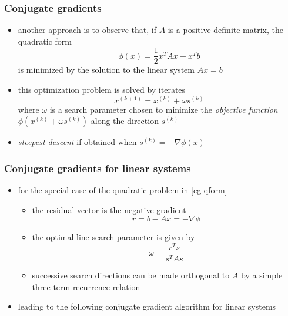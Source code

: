 \begin{frame}[fragile]
%
  \frametitle{Conjugate gradients}
%
  \begin{itemize}
%
  \item another approach is to observe that, if $A$ is a positive definite matrix, the
    quadratic form
    \begin{equation}
      \phi(x) = \frac{1}{2} x^{T} A x - x^{T} b \label{eq:cg-qform}
    \end{equation}
    is minimized by the solution to the linear system $Ax = b$
  \item this optimization problem is solved by iterates 
    \begin{equation}
      x^{(k+1)} = x^{(k)} + \omega s^{(k)}
    \end{equation}
    where $\omega$ is a search parameter chosen to minimize the {\em objective function}
    $\phi(x^{(k)} + \omega s^{(k)})$ along the direction $s^{(k)}$
  \item {\em steepest descent} if obtained when $s^{(k)} = - \nabla \phi(x)$
%
  \end{itemize}
%
\end{frame}

\begin{frame}[fragile]
%
  \frametitle{Conjugate gradients for linear systems}
%
  \begin{itemize}
%
  \item for the special case of the quadratic problem in \eqref{cg-qform}
    \begin{itemize}
    \item the residual vector is the negative gradient
      \begin{equation}
        r = b - Ax = - \nabla \phi
      \end{equation}
    \item the optimal line search parameter is given by
      \begin{equation}
        \omega = \frac{r^{T} s}{s^{T} A s}
      \end{equation}
    \item successive search directions can be made orthogonal to $A$ by a simple three-term
      recurrence relation
    \end{itemize}
  \item leading to the following conjugate gradient algorithm for linear systems
%
  \end{itemize}
%
\end{frame}

